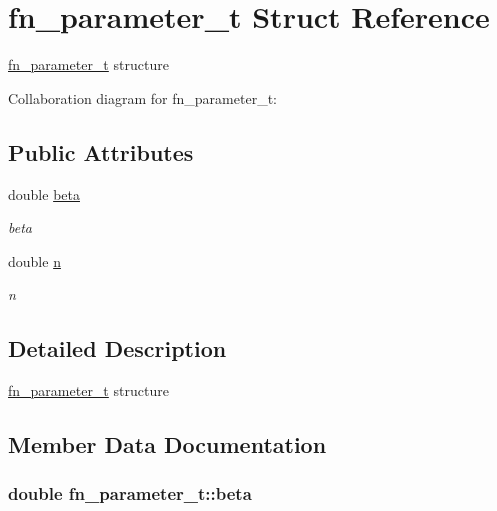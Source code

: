 \hypertarget{structfn__parameter__t}{}\section{fn\+\_\+parameter\+\_\+t Struct Reference}
\label{structfn__parameter__t}


\hyperlink{structfn__parameter__t}{fn\+\_\+parameter\+\_\+t} structure  




Collaboration diagram for fn\+\_\+parameter\+\_\+t\+:
\subsection*{Public Attributes}
\begin{DoxyCompactItemize}
\item 
double \hyperlink{structfn__parameter__t_ab4a9e70fb6fd6c79808721f2dfd7c746}{beta}
\begin{DoxyCompactList}\small\item\em beta \end{DoxyCompactList}\item 
double \hyperlink{structfn__parameter__t_a97f3cf570c3963f3a08dedf71fedee5c}{n}
\begin{DoxyCompactList}\small\item\em n \end{DoxyCompactList}\end{DoxyCompactItemize}


\subsection{Detailed Description}
\hyperlink{structfn__parameter__t}{fn\+\_\+parameter\+\_\+t} structure 

\subsection{Member Data Documentation}
\subsubsection[{\texorpdfstring{beta}{beta}}]{\setlength{\rightskip}{0pt plus 5cm}double fn\+\_\+parameter\+\_\+t\+::beta}\hypertarget{structfn__parameter__t_ab4a9e70fb6fd6c79808721f2dfd7c746}{}\label{structfn__parameter__t_ab4a9e70fb6fd6c79808721f2dfd7c746}


